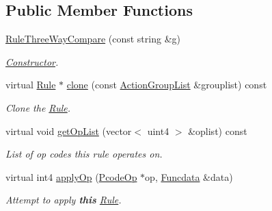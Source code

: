 \subsection*{Public Member Functions}
\begin{DoxyCompactItemize}
\item 
\mbox{\hyperlink{class_rule_three_way_compare_a125e24e9907f0b53b74ca311c0960265}{Rule\+Three\+Way\+Compare}} (const string \&g)
\begin{DoxyCompactList}\small\item\em \mbox{\hyperlink{class_constructor}{Constructor}}. \end{DoxyCompactList}\item 
virtual \mbox{\hyperlink{class_rule}{Rule}} $\ast$ \mbox{\hyperlink{class_rule_three_way_compare_a09b29d9c26493081ff283fa11e845f52}{clone}} (const \mbox{\hyperlink{class_action_group_list}{Action\+Group\+List}} \&grouplist) const
\begin{DoxyCompactList}\small\item\em Clone the \mbox{\hyperlink{class_rule}{Rule}}. \end{DoxyCompactList}\item 
virtual void \mbox{\hyperlink{class_rule_three_way_compare_a7ad9a442c2df958ca7135b231925dd93}{get\+Op\+List}} (vector$<$ uint4 $>$ \&oplist) const
\begin{DoxyCompactList}\small\item\em List of op codes this rule operates on. \end{DoxyCompactList}\item 
virtual int4 \mbox{\hyperlink{class_rule_three_way_compare_af661958d83d132fd75bf054671649a27}{apply\+Op}} (\mbox{\hyperlink{class_pcode_op}{Pcode\+Op}} $\ast$op, \mbox{\hyperlink{class_funcdata}{Funcdata}} \&data)
\begin{DoxyCompactList}\small\item\em Attempt to apply {\bfseries{this}} \mbox{\hyperlink{class_rule}{Rule}}. \end{DoxyCompactList}\end{DoxyCompactItemize}
